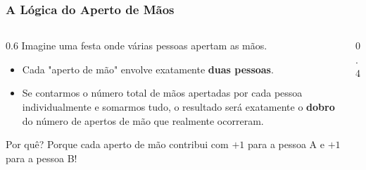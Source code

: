 \documentclass[9pt]{beamer}
\begin{document}
\begin{frame}
    \frametitle{A Lógica do Aperto de Mãos}
    \begin{columns}
        \begin{column}{0.6\textwidth}
            Imagine uma festa onde várias pessoas apertam as mãos.
            \begin{itemize}
                \item Cada "aperto de mão" envolve exatamente \textbf{duas pessoas}.
                \item Se contarmos o número total de mãos apertadas por cada pessoa individualmente e somarmos tudo, o resultado será exatamente o \textbf{dobro} do número de apertos de mão que realmente ocorreram.
            \end{itemize}
            \vspace{0.3cm}
            Por quê? Porque cada aperto de mão contribui com $+1$ para a pessoa A e $+1$ para a pessoa B!
        \end{column}
        \begin{column}{0.4\textwidth}
            \begin{center}
            \end{center}
        \end{column}
    \end{columns}
\end{frame}
\end{document}
